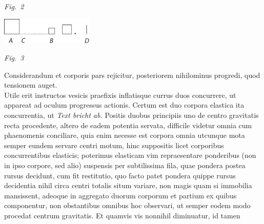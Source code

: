 \vspace{0.5em}
\centerline{\lbrack\textit{Fig.~2}\rbrack}
\vspace{2.0em}
\centerline{\includegraphics[width=0.33\textwidth]{gesamttex/edit_VIII,3/images/LH_37_05_150-151_d3_151r.pdf}} 
\vspace{0.5em}
\centerline{\lbrack\textit{Fig.~3}\rbrack}
\vspace{1.5em}
%  
%
\pstart
Considerandum et 
%
%
corporis pars rejicitur, posteriorem
nihilominus progredi, quod tensionem auget.
\\\indent Utile erit instructos vesicis\protect{} praefixis inflatisque
currus\protect{} duos concurrere, ut appareat ad oculum progressus actionis\protect{}. 
Certum est duo corpora elastica\protect{} ita concurrentia, ut \lbrack\textit{Text bricht ab.}\rbrack 
\pend \pstart
Positis duobus principiis uno de centro gravitatis\protect{} recta procedente, altero de eadem potentia\protect{} servata, 
difficile videtur omnia cum phaenomenis\protect{} conciliare, quia enim necesse est corpora omnia utcunque mota semper eundem 
servare centri motum, hinc suppositis licet corporibus concurrentibus elasticis; poterimus elasticam vim\protect{} repraesentare
ponderibus (non in ipso corpore, sed alio) suspensis per subtilissima fila, quae pondera postea rursus decidunt, cum fit restitutio\protect{}, quo 
facto patet pondera quippe rursus decidentia nihil circa centri totalis situm variare, non magis quam si 
immobilia mansissent, adeoque in aggregato duorum corporum et partium ex quibus componentur, non obstantibus omnibus hoc 
observari, ut semper eodem modo procedat centrum gravitatis\protect{}. 
%
Et quamvis vis nonnihil diminuatur, id tamen
